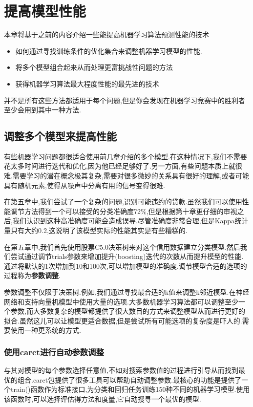 \documentclass[11pt,a4paper,oneside]{book}
\begin{document}
\chapter{提高模型性能}

本章将基于之前的内容介绍一些能提高机器学习算法预测性能的技术
\begin{itemize}
	\item 如何通过寻找训练条件的优化集合来调整机器学习模型的性能.
	\item 将多个模型组合起来从而处理更富挑战性问题的方法
	\item 获得机器学习算法最大程度性能的最先进的技术
\end{itemize}
并不是所有这些方法都适用于每个问题,但是你会发现在机器学习竞赛中的胜利者至少会用到其中一种方法.
\section{调整多个模型来提高性能}
有些机器学习问题都很适合使用前几章介绍的多个模型.在这种情况下,我们不需要花太多时间进行迭代和优化,因为他已经足够好了.另一方面,有些问题本质上就很难.需要学习的潜在概念极其复杂,需要对很多微妙的关系具有很好的理解,或者可能具有随机元素,使得从噪声中分离有用的信号变得很难.

在第五章中,我们尝试了一个复杂的问题,识别可能违约的贷款.虽然我们可以使用性能调节方法得到一个可以接受的分类准确度72\%,但是根据第十章更仔细的审视之后,我们认识到这种高准确度可能会造成误导.尽管准确度非常合理,但是Kappa统计量只有大约0.2,这说明了该模型实际的性能其实是有些糟糕的.

在第五章中,我们首先使用股票C5.0决策树来对这个信用数据建立分类模型.然后我们尝试通过调节trials参数来增加提升(boosting)迭代的次数从而提升模型的性能.通过将默认的1次增加到10和100次,可以增加模型的准确度.调节模型合适的选项的过程称为\textbf{参数调整}.

参数调整不仅限于决策树.例如,我们通过寻找最合适的k值来调整k邻近模型.在神经网络和支持向量机模型中使用大量的选项.大多数机器学习算法都可以调整至少一个参数,而大多数复杂的模型都提供了很大数目的方式来调整模型从而进行更好的拟合.虽然这儿可以让模型更适合数据,但是尝试所有可能选项的复杂度是吓人的.需要使用一种更系统的方式.

\subsection{使用caret进行自动参数调整}
与其对模型的每个参数选择任意值,不如对搜索参数值的过程进行引导从而找到最优的组合.caret包提供了很多工具可以帮助自动调整参数.最核心的功能是提供了一个train()函数作为标准接口,为分类和回归任务训练150种不同的机器学习模型.使用该函数时,可以选择评估得方法和度量,它自动搜寻一个最优的模型.
\end{document}
